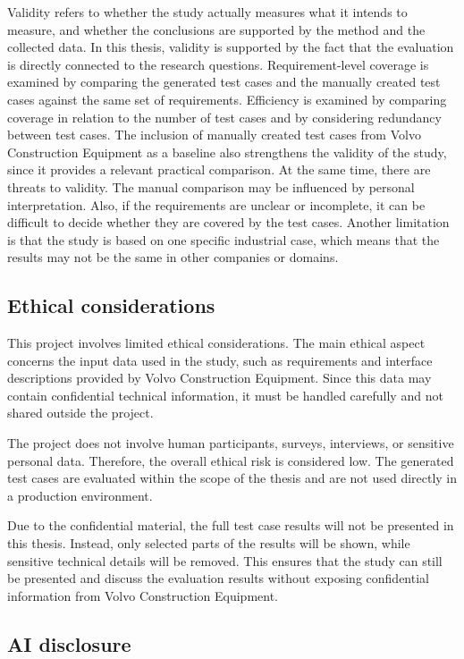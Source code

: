 \documentclass[a4paper,12pt]{article}
\begin{document}
Validity refers to whether the study actually measures what it intends to measure, and whether the conclusions are supported by the method and the collected data. In this thesis, validity is supported by the fact that the evaluation is directly connected to the research questions. Requirement-level coverage is examined by comparing the generated test cases and the manually created test cases against the same set of requirements. Efficiency is examined by comparing coverage in relation to the number of test cases and by considering redundancy between test cases. The inclusion of manually created test cases from Volvo Construction Equipment as a baseline also strengthens the validity of the study, since it provides a relevant practical comparison. At the same time, there are threats to validity. The manual comparison may be influenced by personal interpretation. Also, if the requirements are unclear or incomplete, it can be difficult to decide whether they are covered by the test cases. Another limitation is that the study is based on one specific industrial case, which means that the results may not be the same in other companies or domains.

\subsection{Ethical considerations}
This project involves limited ethical considerations. The main ethical aspect concerns the input data used in the study, such as requirements and interface descriptions provided by Volvo Construction Equipment. Since this data may contain confidential technical information, it must be handled carefully and not shared outside the project.

The project does not involve human participants, surveys, interviews, or sensitive personal data. Therefore, the overall ethical risk is considered low. The generated test cases are evaluated within the scope of the thesis and are not used directly in a production environment.

Due to the confidential material, the full test case results will not be presented in this thesis. Instead, only selected parts of the results will be shown, while sensitive technical details will be removed. This ensures that the study can still be presented and discuss the evaluation results without exposing confidential information from Volvo Construction Equipment. 


\subsection{AI disclosure}
\end{document}
